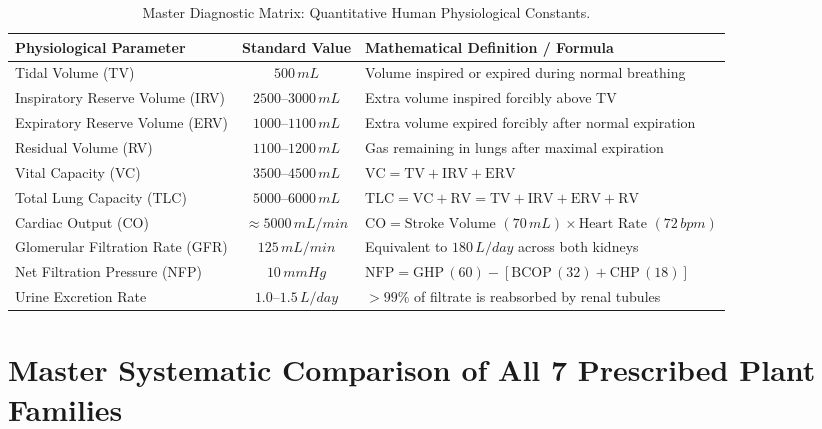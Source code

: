 \documentclass[10pt,twoside,openright]{book}
\begin{document}
\begin{table}[htbp]
\centering
\small
\renewcommand{\arraystretch}{1.2}
\begin{tabularx}{\textwidth}{L c L}
\toprule
\textbf{Physiological Parameter} & \textbf{Standard Value} & \textbf{Mathematical Definition / Formula} \\
\midrule
Tidal Volume (TV) & $500\,\si{mL}$ & Volume inspired or expired during normal breathing \\
Inspiratory Reserve Volume (IRV) & $2500$--$3000\,\si{mL}$ & Extra volume inspired forcibly above TV \\
Expiratory Reserve Volume (ERV) & $1000$--$1100\,\si{mL}$ & Extra volume expired forcibly after normal expiration \\
Residual Volume (RV) & $1100$--$1200\,\si{mL}$ & Gas remaining in lungs after maximal expiration \\
Vital Capacity (VC) & $3500$--$4500\,\si{mL}$ & $\mathrm{VC} = \mathrm{TV} + \mathrm{IRV} + \mathrm{ERV}$ \\
Total Lung Capacity (TLC) & $5000$--$6000\,\si{mL}$ & $\mathrm{TLC} = \mathrm{VC} + \mathrm{RV} = \mathrm{TV} + \mathrm{IRV} + \mathrm{ERV} + \mathrm{RV}$ \\
\midrule
Cardiac Output (CO) & $\approx 5000\,\si{mL/min}$ & $\mathrm{CO} = \text{Stroke Volume } (70\,\si{mL}) \times \text{Heart Rate } (72\,\si{bpm})$ \\
Glomerular Filtration Rate (GFR) & $125\,\si{mL/min}$ & Equivalent to $180\,\si{L/day}$ across both kidneys \\
Net Filtration Pressure (NFP) & $10\,\si{mmHg}$ & $\mathrm{NFP} = \mathrm{GHP}\,(60) - [\mathrm{BCOP}\,(32) + \mathrm{CHP}\,(18)]$ \\
Urine Excretion Rate & $1.0$--$1.5\,\si{L/day}$ & $>99\%$ of filtrate is reabsorbed by renal tubules \\
\bottomrule
\end{tabularx}
\caption{Master Diagnostic Matrix: Quantitative Human Physiological Constants.}
\end{table}

\section{Master Systematic Comparison of All 7 Prescribed Plant Families}
\end{document}
